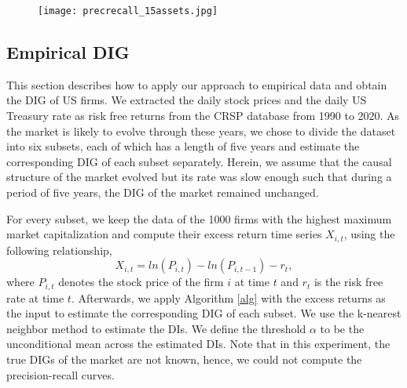 
\begin{figure}[h]
\centering
\texttt{[image: precrecall\_15assets.jpg]}
\label{fig:perfnonlin}
\end{figure}

\subsection{Empirical DIG}

This section describes how to apply our approach to empirical data and obtain the DIG of US firms. 
We extracted the daily stock prices and the daily US Treasury rate as risk free returns from the CRSP database from 1990 to 2020. 
As the market is likely to evolve through these years, 
we chose to divide the dataset into six subsets, each of which has a length of five years and estimate the corresponding DIG of each subset separately. 
Herein, we assume that the causal structure of the market evolved but its rate was slow enough such that during a period of five years, the DIG of the market remained unchanged. 

For every subset, we keep the data of the 1000 firms with the highest maximum market capitalization and compute their excess return time series $X_{i,t}$, using the following relationship,
\begin{equation}
X_{i,t} = ln(P_{i,t}) - ln(P_{i,t-1}) - r_t,  
\end{equation}
where $P_{i,t}$ denotes the stock price of the firm $i$ at time $t$ and $r_{t}$ is the risk free rate at time $t$. 
Afterwards, we apply Algorithm \ref{alg} with the excess returns as the input to estimate the corresponding DIG of each subset. 
We use the k-nearest neighbor method to estimate the DIs.
We define the threshold $\alpha$ to be the unconditional mean across the estimated DIs. Note that in this experiment, the true DIGs of the market are not known, hence, we could not compute the precision-recall curves.

